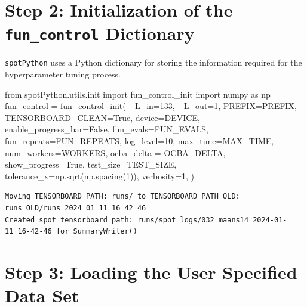 \documentclass[
  letterpaper,
  DIV=11,
  numbers=noendperiod]{scrreprt}
\newenvironment{Shaded}{\begin{snugshade}}{\end{snugshade}}
\newcommand{\DecValTok}[1]{\textcolor[rgb]{0.68,0.00,0.00}{#1}}
\newcommand{\ImportTok}[1]{\textcolor[rgb]{0.00,0.46,0.62}{#1}}
\newcommand{\NormalTok}[1]{\textcolor[rgb]{0.00,0.23,0.31}{#1}}
\newcommand{\OperatorTok}[1]{\textcolor[rgb]{0.37,0.37,0.37}{#1}}
\newcommand{\VariableTok}[1]{\textcolor[rgb]{0.07,0.07,0.07}{#1}}
\begin{document}
\section{\texorpdfstring{Step 2: Initialization of the
\texttt{fun\_control}
Dictionary}{Step 2: Initialization of the fun\_control Dictionary}}\label{step-2-initialization-of-the-fun_control-dictionary-2}

\texttt{spotPython} uses a Python dictionary for storing the information
required for the hyperparameter tuning process.

\begin{Shaded}
\begin{Highlighting}[]
\ImportTok{from}\NormalTok{ spotPython.utils.init }\ImportTok{import}\NormalTok{ fun\_control\_init}
\ImportTok{import}\NormalTok{ numpy }\ImportTok{as}\NormalTok{ np}
\NormalTok{fun\_control }\OperatorTok{=}\NormalTok{ fun\_control\_init(}
\NormalTok{    \_L\_in}\OperatorTok{=}\DecValTok{133}\NormalTok{,}
\NormalTok{    \_L\_out}\OperatorTok{=}\DecValTok{1}\NormalTok{,}
\NormalTok{    PREFIX}\OperatorTok{=}\NormalTok{PREFIX,}
\NormalTok{    TENSORBOARD\_CLEAN}\OperatorTok{=}\VariableTok{True}\NormalTok{,}
\NormalTok{    device}\OperatorTok{=}\NormalTok{DEVICE,}
\NormalTok{    enable\_progress\_bar}\OperatorTok{=}\VariableTok{False}\NormalTok{,}
\NormalTok{    fun\_evals}\OperatorTok{=}\NormalTok{FUN\_EVALS,}
\NormalTok{    fun\_repeats}\OperatorTok{=}\NormalTok{FUN\_REPEATS,}
\NormalTok{    log\_level}\OperatorTok{=}\DecValTok{10}\NormalTok{,}
\NormalTok{    max\_time}\OperatorTok{=}\NormalTok{MAX\_TIME,}
\NormalTok{    num\_workers}\OperatorTok{=}\NormalTok{WORKERS,}
\NormalTok{    ocba\_delta }\OperatorTok{=}\NormalTok{ OCBA\_DELTA,}
\NormalTok{    show\_progress}\OperatorTok{=}\VariableTok{True}\NormalTok{,}
\NormalTok{    test\_size}\OperatorTok{=}\NormalTok{TEST\_SIZE,}
\NormalTok{    tolerance\_x}\OperatorTok{=}\NormalTok{np.sqrt(np.spacing(}\DecValTok{1}\NormalTok{)),}
\NormalTok{    verbosity}\OperatorTok{=}\DecValTok{1}\NormalTok{,}
\NormalTok{    )}
\end{Highlighting}
\end{Shaded}

\begin{verbatim}
Moving TENSORBOARD_PATH: runs/ to TENSORBOARD_PATH_OLD: runs_OLD/runs_2024_01_11_16_42_46
Created spot_tensorboard_path: runs/spot_logs/032_maans14_2024-01-11_16-42-46 for SummaryWriter()
\end{verbatim}

\section{Step 3: Loading the User Specified Data
Set}\label{step-3-loading-the-user-specified-data-set}
\end{document}
